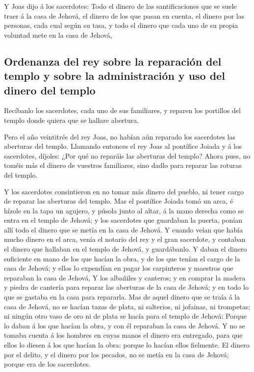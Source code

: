  Y Joas dijo á los sacerdotes: Todo el dinero de las
santificaciones que se suele traer á la casa de Jehová, el dinero de los
que pasan en cuenta, el dinero por las personas, cada cual según su
tasa, y todo el dinero que cada uno de su propia voluntad mete en la
casa de Jehová,

\hypertarget{ordenanza-del-rey-sobre-la-reparaciuxf3n-del-templo-y-sobre-la-administraciuxf3n-y-uso-del-dinero-del-templo}{%
\subsection{Ordenanza del rey sobre la reparación del templo y sobre la
administración y uso del dinero del
templo}\label{ordenanza-del-rey-sobre-la-reparaciuxf3n-del-templo-y-sobre-la-administraciuxf3n-y-uso-del-dinero-del-templo}}

 Recíbanlo los sacerdotes, cada uno de sus familiares, y
reparen los portillos del templo donde quiera que se hallare abertura.

 Pero el año veintitrés del rey Joas, no habían aún
reparado los sacerdotes las aberturas del templo. 
Llamando entonces el rey Joas al pontífice Joiada y á los sacerdotes,
díjoles: ¿Por qué no reparáis las aberturas del templo? Ahora pues, no
toméis más el dinero de vuestros familiares, sino dadlo para reparar las
roturas del templo.

 Y los sacerdotes consintieron en no tomar más dinero del
pueblo, ni tener cargo de reparar las aberturas del templo.
 Mas el pontífice Joiada tomó un arca, é hízole en la tapa
un agujero, y púsola junto al altar, á la mano derecha como se entra en
el templo de Jehová; y los sacerdotes que guardaban la puerta, ponían
allí todo el dinero que se metía en la casa de Jehová.  Y
cuando veían que había mucho dinero en el arca, venía el notario del rey
y el gran sacerdote, y contaban el dinero que hallaban en el templo de
Jehová, y guardábanlo.  Y daban el dinero suficiente en
mano de los que hacían la obra, y de los que tenían el cargo de la casa
de Jehová; y ellos lo expendían en pagar los carpinteros y maestros que
reparaban la casa de Jehová,  Y los albañiles y canteros;
y en comprar la madera y piedra de cantería para reparar las aberturas
de la casa de Jehová; y en todo lo que se gastaba en la casa para
repararla.  Mas de aquel dinero que se traía á la casa de
Jehová, no se hacían tazas de plata, ni salterios, ni jofainas, ni
trompetas; ni ningún otro vaso de oro ni de plata se hacía para el
templo de Jehová:  Porque lo daban á los que hacían la
obra, y con él reparaban la casa de Jehová.  Y no se
tomaba cuenta á los hombres en cuyas manos el dinero era entregado, para
que ellos lo diesen á los que hacían la obra: porque lo hacían ellos
fielmente.  El dinero por el delito, y el dinero por los
pecados, no se metía en la casa de Jehová; porque era de los sacerdotes.

